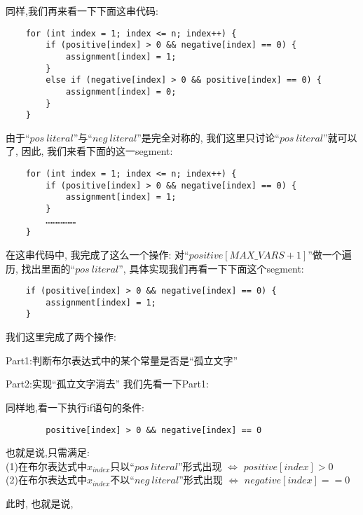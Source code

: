         同样,我们再来看一下下面这串代码:
        \begin{lstlisting}
    for (int index = 1; index <= n; index++) {
        if (positive[index] > 0 && negative[index] == 0) {
            assignment[index] = 1; 
        }
        else if (negative[index] > 0 && positive[index] == 0) {
            assignment[index] = 0;  
        }
    }
        \end{lstlisting}
        由于``$pos \ literal$''与``$neg\ literal$''是完全对称的,
        我们这里只讨论``$pos \ literal$''就可以了,
        因此,
        我们来看下面的这一segment:
        \begin{lstlisting}
    for (int index = 1; index <= n; index++) {
        if (positive[index] > 0 && negative[index] == 0) {
            assignment[index] = 1; 
        }
        ………………
    }
        \end{lstlisting}
        \par
        在这串代码中,
        我完成了这么一个操作:
        对``$positive[MAX\_VARS+1]$''做一个遍历,
        找出里面的``$pos \ literal$'',
        具体实现我们再看一下下面这个segment:
        \begin{lstlisting}
    if (positive[index] > 0 && negative[index] == 0) {
        assignment[index] = 1; 
    }
        \end{lstlisting}
        我们这里完成了两个操作:
        \par
        Part1:判断布尔表达式中的某个常量是否是``孤立文字''
        \par
        Part2:实现``孤立文字消去''
        \newline
        \newline
        \noindent
        我们先看一下Part1:
        \newline
        \par
        同样地,看一下执行if语句的条件:
        \begin{lstlisting}
        positive[index] > 0 && negative[index] == 0
        \end{lstlisting}
        \par
        也就是说,只需满足:
        \\
        (1)在布尔表达式中$x_{index}$只以``$pos\ literal$''形式出现
        $\Leftrightarrow$ 
        $positive[index]>0$
        \\
        (2)在布尔表达式中$x_{index}$不以``$neg\ literal$''形式出现 
        $\Leftrightarrow$
        $negative[index]==0$
        \par
        此时,
        也就是说,

